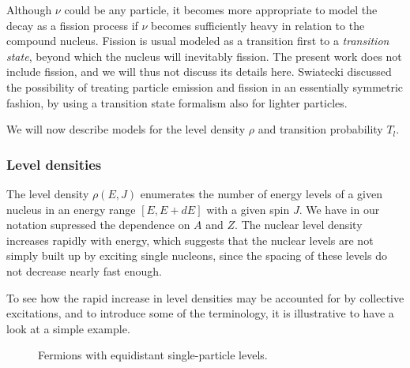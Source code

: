 Although $\nu$ could be any particle, it becomes more appropriate to model the decay as a fission process if $\nu$ becomes sufficiently heavy in relation to the compound nucleus. Fission is usual modeled as a transition first to a \emph{transition state}, beyond which the nucleus will inevitably fission\cite{krane:book}. The present work does not include fission, and we will thus not discuss its details here. Swiatecki discussed the possibility of treating particle emission and fission in an essentially symmetric fashion, by using a transition state formalism also for lighter particles\cite{swiatecki:1983:art}. 

We will now describe models for the level density $\rho$ and transition probability $T_l$.

\subsubsection{Level densities}
The level density $\rho(E,J)$ enumerates the number of energy levels of a given nucleus in an energy range $[E,E+dE]$ with a given spin $J$. We have in our notation supressed the dependence on $A$ and $Z$. The nuclear level density increases rapidly with energy, which suggests that the nuclear levels are not simply built up by exciting single nucleons, since the spacing of these levels do not decrease nearly fast enough.

To see how the rapid increase in level densities may be accounted for by collective excitations, and to introduce some of the terminology, it is illustrative to have a look at a simple example.

\begin{figure}

\caption{\label{fig:equidist} Fermions with equidistant single-particle levels.}
\end{figure}

